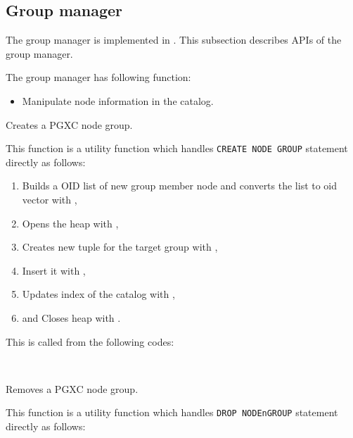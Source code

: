 
\subsection{Group manager}

  The group manager is implemented in . This subsection describes
  APIs of the group manager.
  
  The group manager has following function:

  \begin{itemize}
  \item Manipulate node information in the  catalog.
  \end{itemize}
  
  
  
    Creates a PGXC node group.
    
    This function is a utility function which handles \texttt{CREATE NODE GROUP} statement directly as follows:
    
	\begin{enumerate}
		\item Builds a OID list of new group member node and converts the list to oid vector with ,
		\item Opens the heap with ,
		\item Creates new tuple for the target group with ,
		\item Insert it with ,
		\item Updates index of the catalog with ,
	    \item and Closes heap with .
	\end{enumerate}
    
    This is called from the following codes:
    
    \FuncRefHdr
		\\ \hline
    \FuncRefTrailor
  
  
    Removes a PGXC node group.
    
    This function is a utility function which handles \texttt{DROP NODEnGROUP} statement directly as follows:
    
